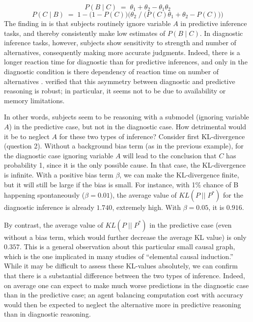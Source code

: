 \documentclass[10pt,letterpaper]{article}
\begin{document}
$$P(B\mid C) \;= \; \theta_1 + \theta_2 - \theta_1\theta_2$$
$$P(C \mid B) \;= \; 1- \big(1-P(C)\big)\Big(\theta_2\;/\;\big(P(C)\theta_1 + \theta_2  - P(C)\big)\Big)$$
The finding in \cite{Fernbach2011} is that subjects routinely ignore variable $A$ in predictive inference tasks, and thereby consistently make low estimates of $P(B\mid C)$. In diagnostic inference tasks, however, subjects show sensitivity to strength and number of alternatives, consequently making more accurate judgments. Indeed, there is a longer reaction time for diagnostic than for predictive inferences, and only in the diagnostic condition is there dependency of reaction time on number of alternatives \citep{Fernbach2010}. \cite{Fernbach2013} verified that this asymmetry between diagnostic and predictive reasoning is robust; in particular, it seems not to be due to availability or memory limitations.

In other words, subjects seem to be reasoning with a submodel (ignoring variable $A$) in the predictive case, but not in the diagnostic case. How detrimental would it be to neglect $A$ for these two types of inference? Consider first KL-divergence (question 2). Without a background bias term (as in the previous example), for the diagnostic case ignoring variable $A$ will lead to the conclusion that $C$ has probability 1, since it is the only possible cause. In that case, the KL-divergence is infinite. With a positive bias term $\beta$, we can make the KL-divergence finite, but it will still be large if the bias is small. For instance, with 1\% chance of B happening spontaneously ($\beta = 0.01$), the average value of $KL(P\;||\;P^*)$ for the diagnostic inference is already $1.740$, extremely high. With $\beta=0.05$, it is $0.916$.

By contrast, the average value of $KL(P\;||\;P^*)$ in the predictive case (even without a bias term, which would further decrease the average KL value) is only $0.357$.  
This is a general observation about this particular small causal graph, which is the one implicated in many studies of ``elemental causal induction.'' 
While it may be difficult to assess these KL-values absolutely, we can confirm that there is a substantial difference between the two types of inference. Indeed, on average one can expect to make much worse predictions in the diagnostic case than in the predictive case; an agent balancing computation cost with accuracy would then be expected to neglect the alternative more in predictive reasoning than in diagnostic reasoning.
\end{document}
